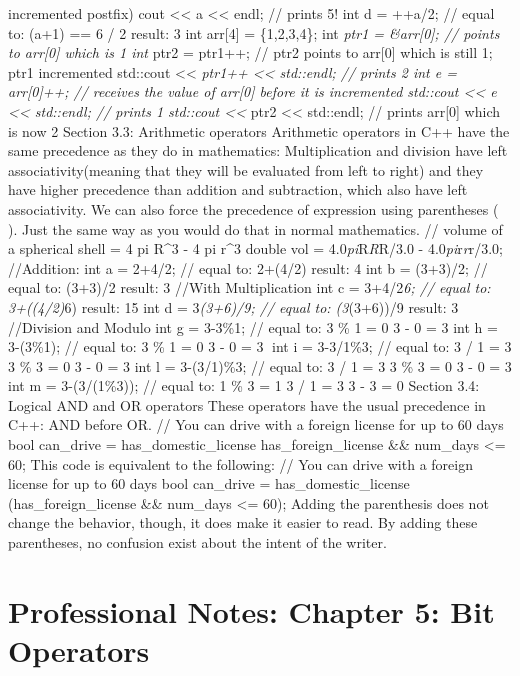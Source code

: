 incremented postfix) cout \textless\textless{} a \textless\textless{}
endl; // prints 5! int d = ++a/2; // equal to: (a+1) == 6 / 2 result: 3
int arr{[}4{]} = \{1,2,3,4\}; int \emph{ptr1 = \&arr{[}0{]}; // points
to arr{[}0{]} which is 1 int }ptr2 = ptr1++; // ptr2 points to
arr{[}0{]} which is still 1; ptr1 incremented std::cout
\textless\textless{} \emph{ptr1++ \textless\textless{} std::endl; //
prints 2 int e = arr{[}0{]}++; // receives the value of arr{[}0{]}
before it is incremented std::cout \textless\textless{} e
\textless\textless{} std::endl; // prints 1 std::cout
\textless\textless{} }ptr2 \textless\textless{} std::endl; // prints
arr{[}0{]} which is now 2 Section 3.3: Arithmetic operators Arithmetic
operators in C++ have the same precedence as they do in mathematics:
Multiplication and division have left associativity(meaning that they
will be evaluated from left to right) and they have higher precedence
than addition and subtraction, which also have left associativity. We
can also force the precedence of expression using parentheses ( ). Just
the same way as you would do that in normal mathematics. // volume of a
spherical shell = 4 pi R\^{}3 - 4 pi r\^{}3 double vol =
4.0\emph{pi}R\emph{R}R/3.0 - 4.0\emph{pi}r\emph{r}r/3.0; //Addition: int
a = 2+4/2; // equal to: 2+(4/2) result: 4 int b = (3+3)/2; // equal to:
(3+3)/2 result: 3 //With Multiplication int c = 3+4/2\emph{6; // equal
to: 3+((4/2)}6) result: 15 int d = 3\emph{(3+6)/9; // equal to:
(3}(3+6))/9 result: 3 //Division and Modulo int g = 3-3\%1; // equal to:
3 \% 1 = 0 3 - 0 = 3 int h = 3-(3\%1); // equal to: 3 \% 1 = 0 3 - 0 = 3
int i = 3-3/1\%3; // equal to: 3 / 1 = 3 3 \% 3 = 0 3 - 0 = 3 int l =
3-(3/1)\%3; // equal to: 3 / 1 = 3 3 \% 3 = 0 3 - 0 = 3 int m =
3-(3/(1\%3)); // equal to: 1 \% 3 = 1 3 / 1 = 3 3 - 3 = 0 Section 3.4:
Logical AND and OR operators These operators have the usual precedence
in C++: AND before OR. // You can drive with a foreign license for up to
60 days bool can\_drive = has\_domestic\_license \textbar\textbar{}
has\_foreign\_license \&\& num\_days \textless= 60; This code is
equivalent to the following: // You can drive with a foreign license for
up to 60 days bool can\_drive = has\_domestic\_license
\textbar\textbar{} (has\_foreign\_license \&\& num\_days \textless= 60);
Adding the parenthesis does not change the behavior, though, it does
make it easier to read. By adding these parentheses, no confusion exist
about the intent of the writer.

\hypertarget{professional-notes-chapter-5-bit-operators}{%
\chapter{Professional Notes: Chapter 5: Bit
Operators}\label{professional-notes-chapter-5-bit-operators}}

